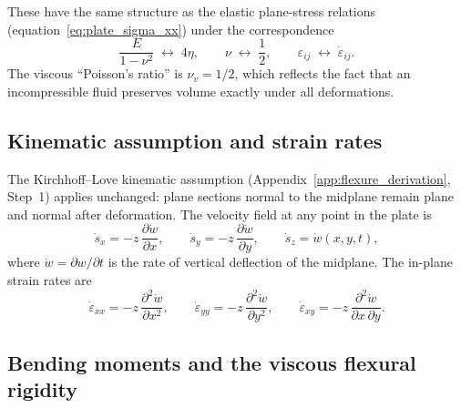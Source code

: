 \documentclass[11pt]{article}
\begin{document}
\noindent These have the same structure as the elastic plane-stress relations (equation~\eqref{eq:plate_sigma_xx}) under the correspondence
\begin{equation}
  \frac{E}{1-\nu^2} \;\longleftrightarrow\; 4\eta, \qquad \nu \;\longleftrightarrow\; \frac{1}{2}, \qquad \varepsilon_{ij} \;\longleftrightarrow\; \dot{\varepsilon}_{ij}.
  \label{eq:elastic_viscous_analogy}
\end{equation}
The viscous ``Poisson's ratio'' is $\nu_v = 1/2$, which reflects the fact that an incompressible fluid preserves volume exactly under all deformations.

\subsection*{Kinematic assumption and strain rates}

The Kirchhoff--Love kinematic assumption (Appendix~\ref{app:flexure_derivation}, Step~1) applies unchanged: plane sections normal to the midplane remain plane and normal after deformation.  The velocity field at any point in the plate is
\begin{equation}
  \dot{s}_x = -z\,\frac{\partial \dot{w}}{\partial x}, \qquad \dot{s}_y = -z\,\frac{\partial \dot{w}}{\partial y}, \qquad \dot{s}_z = \dot{w}(x,y,t),
\end{equation}
where $\dot{w} = \partial w / \partial t$ is the rate of vertical deflection of the midplane.  The in-plane strain rates are
\begin{equation}
  \dot{\varepsilon}_{xx} = -z\,\frac{\partial^2 \dot{w}}{\partial x^2}, \qquad \dot{\varepsilon}_{yy} = -z\,\frac{\partial^2 \dot{w}}{\partial y^2}, \qquad \dot{\varepsilon}_{xy} = -z\,\frac{\partial^2 \dot{w}}{\partial x\,\partial y}.
  \label{eq:viscous_plate_strain_rates}
\end{equation}

\subsection*{Bending moments and the viscous flexural rigidity}
\end{document}
